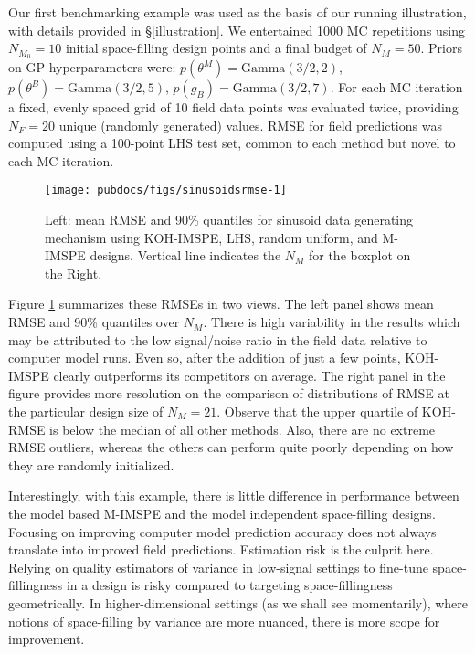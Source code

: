 \documentclass[
]{article}
\begin{document}
Our first benchmarking example was used as the basis of
our running illustration, with details provided in \S \ref{illustration}. We entertained
1000 MC repetitions using \(N_{M_0} = 10\) initial space-filling design points and a final budget of \(N_M = 50\). Priors on GP hyperparameters were: \(p(\theta^M) = \mathrm{Gamma}(3/2, 2)\), \(p(\theta^B) = \mathrm{Gamma}(3/2, 5)\),
\(p(g_B) = \mathrm{Gamma}(3/2,7)\). For each MC iteration a
fixed, evenly spaced grid of 10 field data
points was evaluated twice, providing \(N_F = 20\) unique (randomly generated) values. RMSE for field predictions was computed using a 100-point LHS test set, common to each method but novel to each MC iteration.

\begin{figure}[ht!]
\texttt{[image: pubdocs/figs/sinusoidsrmse-1]} \caption{Left: mean RMSE and 90\% quantiles for sinusoid data generating mechanism using KOH-IMSPE, LHS, random uniform, and M-IMSPE designs.  Vertical line indicates the $N_M$ for the boxplot on the Right.}\label{fig:sinusoidsrmse}
\end{figure}

Figure \ref{fig:sinusoidsrmse} summarizes these RMSEs in two views. The left
panel shows mean RMSE and 90\% quantiles over \(N_M\). There is high variability
in the results which may be attributed to the low signal/noise ratio in the
field data relative to computer model runs. Even so, after the addition of
just a few points, KOH-IMSPE clearly outperforms its competitors on average.
The right panel in the figure provides more resolution on the comparison of
distributions of RMSE at the particular design size of \(N_M = 21\). Observe
that the upper quartile of KOH-RMSE is below the median of all other methods.
Also, there are no extreme RMSE outliers, whereas the others can perform quite
poorly depending on how they are randomly initialized.

Interestingly, with this example, there is little difference in performance
between the model based M-IMSPE and the model independent space-filling
designs. Focusing on improving computer model prediction accuracy does not
always translate into improved field predictions. Estimation risk is the
culprit here. Relying on quality estimators of variance in low-signal
settings to fine-tune space-fillingness in a design is risky compared to
targeting space-fillingness geometrically. In higher-dimensional settings (as
we shall see momentarily), where notions of space-filling by variance are more
nuanced, there is more scope for improvement.
\end{document}
